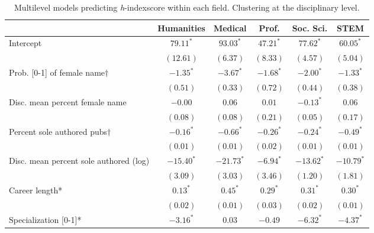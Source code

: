 \documentclass[
  10pt,
  letterpaper,
]{article}
\begin{document}
\hypertarget{tbl-models-field}{}
\begin{table}[!t]
\begin{adjustwidth}{-1.5in}{0in} %
\caption{\label{tbl-models-field}Multilevel models predicting \emph{h}-indexscore within each field.
Clustering at the disciplinary level. }
\begin{center}
\begin{tabular}{l c c c c c}
\hline
 & Humanities & Medical & Prof. & Soc. Sci. & STEM \\
\hline
Intercept                               & $79.11^{*}$  & $93.03^{*}$  & $47.21^{*}$ & $77.62^{*}$  & $60.05^{*}$  \\
                                        & $(12.61)$    & $(6.37)$     & $(8.33)$    & $(4.57)$     & $(5.04)$     \\
Prob. [0-1] of female name$\dagger$     & $-1.35^{*}$  & $-3.67^{*}$  & $-1.68^{*}$ & $-2.00^{*}$  & $-1.33^{*}$  \\
                                        & $(0.51)$     & $(0.33)$     & $(0.72)$    & $(0.44)$     & $(0.38)$     \\
Disc. mean percent female name          & $-0.00$      & $0.06$       & $0.01$      & $-0.13^{*}$  & $0.06$       \\
                                        & $(0.08)$     & $(0.08)$     & $(0.21)$    & $(0.05)$     & $(0.17)$     \\
Percent sole authored pubs$\dagger$     & $-0.16^{*}$  & $-0.66^{*}$  & $-0.26^{*}$ & $-0.24^{*}$  & $-0.49^{*}$  \\
                                        & $(0.01)$     & $(0.01)$     & $(0.02)$    & $(0.01)$     & $(0.01)$     \\
Disc. mean percent sole authored (log)  & $-15.40^{*}$ & $-21.73^{*}$ & $-6.94^{*}$ & $-13.62^{*}$ & $-10.79^{*}$ \\
                                        & $(3.09)$     & $(3.03)$     & $(3.46)$    & $(1.20)$     & $(1.81)$     \\
Career length*                          & $0.13^{*}$   & $0.45^{*}$   & $0.29^{*}$  & $0.31^{*}$   & $0.30^{*}$   \\
                                        & $(0.02)$     & $(0.01)$     & $(0.03)$    & $(0.02)$     & $(0.01)$     \\
Specialization [0-1]*                   & $-3.16^{*}$  & $0.03$       & $-0.49$     & $-6.32^{*}$  & $-4.37^{*}$  \\

\end{tabular}
\end{center}
\end{adjustwidth}
\end{table}
\end{document}
